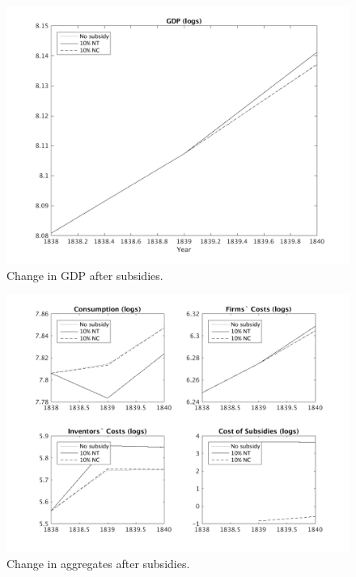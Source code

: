 \documentclass[serif]{article}
\theoremstyle{definition}
\begin{document}
\begin{figure}[h!]
\centering
\includegraphics[width=\textwidth]{figures/gdp_subs.png}
\caption{Change in GDP after subsidies.}
\end{figure}

\begin{figure}[h!]
\centering
\includegraphics[width=\textwidth]{figures/aggregates_subs.png}
\caption{Change in aggregates after subsidies.}
\end{figure}
\end{document}
